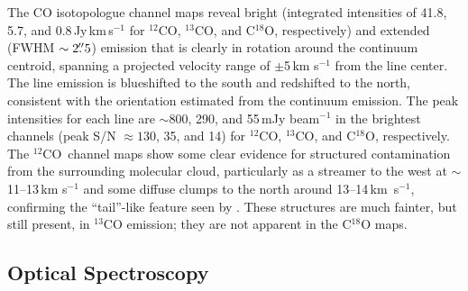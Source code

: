 \documentclass[twocolumn]{aastex61}
\newcommand{\twelve}{${}^{12}$CO}
\newcommand{\thirteen}{${}^{13}$CO}
\newcommand{\eighteen}{C${}^{18}$O}
\begin{document}
The CO isotopologue channel maps reveal bright (integrated intensities of 41.8, 5.7, and 0.8\,Jy\,km\,s$^{-1}$ for $^{12}$CO, $^{13}$CO, and C$^{18}$O, respectively) and extended (FWHM $\sim 2\mbox{$.\!\!^{\prime\prime}$}5$) emission that is clearly in rotation around the continuum centroid, spanning a projected velocity range of $\pm$5\,km s$^{-1}$ from the line center.  The line emission is blueshifted to the south and redshifted to the north, consistent with the orientation estimated from the continuum emission. The peak intensities for each line are $\sim$800, 290, and 55\,mJy beam$^{-1}$ in the brightest channels (peak S/N $\approx 130$, 35, and 14) for \twelve, \thirteen, and \eighteen, respectively. The \twelve\ channel maps show some clear evidence for structured contamination from the surrounding molecular cloud, particularly as a streamer to the west at $\sim$11--13\,km s$^{-1}$ and some diffuse clumps to the north around \mbox{13--14\,km s$^{-1}$}, confirming the ``tail''-like feature seen by \citet{fang17}.  These structures are much fainter, but still present, in $^{13}$CO emission; they are not apparent in the C$^{18}$O maps.



\subsection{Optical Spectroscopy \label{subsec:spectroscopy}}
\end{document}
